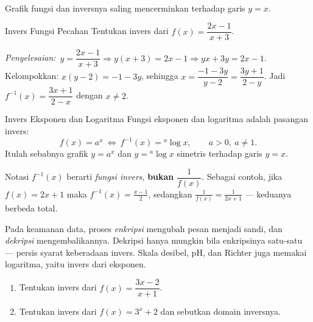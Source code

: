 \documentclass[11pt,a4paper]{report}
\theoremstyle{gaya}
\newcommand{\jawab}{\par\smallskip\noindent\textit{\textcolor{oranye}{Penyelesaian:}}\ }
\begin{document}
\begin{center}
\\
\small Grafik fungsi dan inversnya saling mencerminkan terhadap garis $y=x$.
\end{center}

\begin{contoh}{Invers Fungsi Pecahan}
Tentukan invers dari $f(x)=\dfrac{2x-1}{x+3}$.

\jawab $y=\dfrac{2x-1}{x+3}\Rightarrow y(x+3)=2x-1\Rightarrow yx+3y=2x-1$.
Kelompokkan: $x(y-2)=-1-3y$, sehingga $x=\dfrac{-1-3y}{y-2}=\dfrac{3y+1}{2-y}$.
Jadi $f^{-1}(x)=\dfrac{3x+1}{2-x}$ dengan $x\neq 2$.
\end{contoh}

\begin{konsep}{Invers Eksponen dan Logaritma}
Fungsi eksponen dan logaritma adalah pasangan invers:
\[
f(x)=a^x \ \Longleftrightarrow\ f^{-1}(x)={}^{a}\!\log x, \qquad a>0,\ a\neq1.
\]
Itulah sebabnya grafik $y=a^x$ dan $y={}^{a}\!\log x$ simetris terhadap garis $y=x$.
\end{konsep}

\begin{kesalahan}
Notasi $f^{-1}(x)$ berarti \emph{fungsi invers}, \textbf{bukan} $\dfrac{1}{f(x)}$. Sebagai contoh, jika $f(x)=2x+1$ maka $f^{-1}(x)=\tfrac{x-1}{2}$, sedangkan $\tfrac{1}{f(x)}=\tfrac{1}{2x+1}$ --- keduanya berbeda total.
\end{kesalahan}

\begin{dunianyata}
Pada keamanan data, proses \emph{enkripsi} mengubah pesan menjadi sandi, dan \emph{dekripsi} mengembalikannya. Dekripsi hanya mungkin bila enkripsinya satu-satu --- persis syarat keberadaan invers. Skala desibel, pH, dan Richter juga memakai logaritma, yaitu invers dari eksponen.
\end{dunianyata}

\begin{latihan}
\begin{enumerate}[leftmargin=*]
  \item Tentukan invers dari $f(x)=\dfrac{3x-2}{x+1}$.
  \item Tentukan invers dari $f(x)=3^{x}+2$ dan sebutkan domain inversnya.
\end{enumerate}
\end{latihan}
\end{document}
